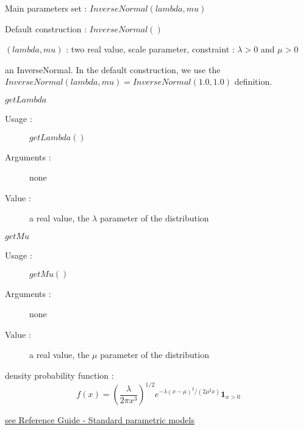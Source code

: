 \begin{description}

\item[Usage :]
  \begin{description}
  \item Main parameters set : $InverseNormal(lambda, mu)$
  \item Default construction : $InverseNormal( )$
  \end{description}

\item[Arguments :]  \rule{0pt}{1em}
  \begin{description}
  \item $(lambda, mu)$ : two  real value, scale parameter, constraint : $\lambda > 0 $ and $\mu>0$
  \end{description}

\item[Value :] an InverseNormal. In the default construction, we use the $InverseNormal(lambda, mu) = InverseNormal(1.0, 1.0)$ definition.

\item[Some methods :]  \rule{0pt}{1em}
  \begin{description}

  \item $getLambda$
    \begin{description}
    \item[Usage :] $getLambda()$
    \item[Arguments :] none
    \item[Value :]  a real value, the $\lambda$ parameter of the  distribution
    \end{description}
    \bigskip

  \item $getMu$
    \begin{description}
    \item[Usage :] $getMu()$
    \item[Arguments :] none
    \item[Value :]  a real value, the $\mu$ parameter of the  distribution
    \end{description}
    \bigskip

  \end{description}

\item[Details :]  \rule{0pt}{1em}
  \begin{description}
  \item density probability function :
    $$
    f(x) = \displaystyle \left(\frac{\lambda}{2\pi x^3} \right)^{1/2}e^{-\lambda(x-\mu)^2/(2\mu^2x)} \mathbf{1}_{x>0}
    $$
  \end{description}

\item[Links :]  \rule{0pt}{1em}
  \href{OpenTURNS_ReferenceGuide.pdf}{see Reference Guide - Standard parametric models}
\end{description}

